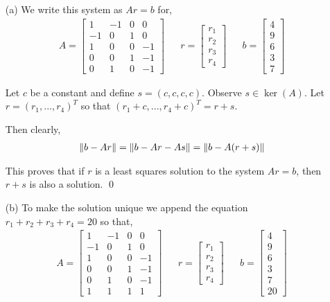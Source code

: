 \documentclass[10pt]{article}
\begin{document}
\begin{solution}[Solution]
\begin{enumerate}
    \item[(a)] 
     We write this system as \( Ar=b \) for,
        \begin{align*}
            A=\left[\begin{array}{cccc}1&-1&0&0\\-1&0&1&0\\1&0&0&-1\\0&0&1&-1\\0&1&0&-1\end{array}\right] && r=\left[\begin{array}{c}r_1\\r_2\\r_3\\r_4\end{array}\right] && b=\left[\begin{array}{c}4\\9\\6\\3\\7\end{array}\right]
        \end{align*}

       Let \( c \) be a constant and define \( s=(c,c,c,c) \). Observe \( s\in\operatorname{ker}(A) \). Let \( r=(r_1, ..., r_4)^T \) so that \(  (r_1+c, ..., r_4+c)^T  = r+s\). 

        Then clearly,
        \begin{align*}
            \left\lVert b-Ar\right\rVert = \left\lVert b-Ar-As\right\rVert = \left\lVert b-A(r+s)\right\rVert
        \end{align*}
        
        This proves that if \( r \) is a least squares solution to the system \( Ar=b \), then \( r+s \) is also a solution. \qed
        
    \item[(b)] To make the solution unique we append the equation \( r_1+r_2+r_3+r_4=20 \) so that, 
         \begin{align*}
             A=\left[\begin{array}{cccc}1&-1&0&0\\-1&0&1&0\\1&0&0&-1\\0&0&1&-1\\0&1&0&-1\\1&1&1&1\end{array}\right] && r=\left[\begin{array}{c}r_1\\r_2\\r_3\\r_4\end{array}\right] && b=\left[\begin{array}{c}4\\9\\6\\3\\7\\20\end{array}\right]
        \end{align*}


\end{enumerate}
\end{solution}
\end{document}
